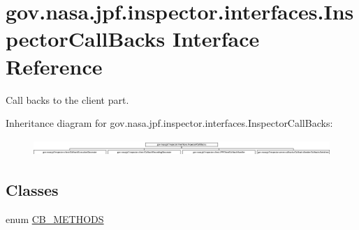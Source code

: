 \hypertarget{interfacegov_1_1nasa_1_1jpf_1_1inspector_1_1interfaces_1_1_inspector_call_backs}{}\section{gov.\+nasa.\+jpf.\+inspector.\+interfaces.\+Inspector\+Call\+Backs Interface Reference}
\label{interfacegov_1_1nasa_1_1jpf_1_1inspector_1_1interfaces_1_1_inspector_call_backs}


Call backs to the client part.  


Inheritance diagram for gov.\+nasa.\+jpf.\+inspector.\+interfaces.\+Inspector\+Call\+Backs\+:\begin{figure}[H]
\begin{center}
\leavevmode
\includegraphics[height=0.612691cm]{interfacegov_1_1nasa_1_1jpf_1_1inspector_1_1interfaces_1_1_inspector_call_backs}
\end{center}
\end{figure}
\subsection*{Classes}
\begin{DoxyCompactItemize}
\item 
enum \hyperlink{enumgov_1_1nasa_1_1jpf_1_1inspector_1_1interfaces_1_1_inspector_call_backs_1_1_c_b___m_e_t_h_o_d_s}{C\+B\+\_\+\+M\+E\+T\+H\+O\+DS}
\end{DoxyCompactItemize}
